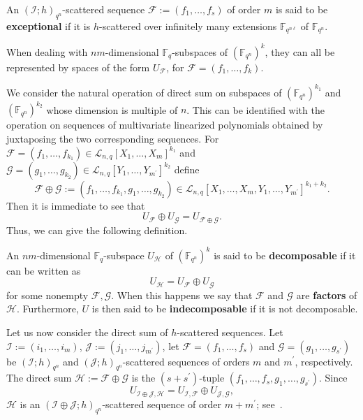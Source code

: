 \begin{defi}\label{Def:ExceptionalScatteredSequence}
An $(\mathcal I;h)_{q^n}$-scattered sequence  $\mathcal{F}:=(f_1,\ldots,f_s)$ of order $m$  is said to be \textbf{exceptional} if it is $h$-scattered over infinitely many extensions $\mathbb{F}_{q^{n\ell}}$ of $\mathbb{F}_{q^n}$.
\end{defi}

When dealing with $nm$-dimensional $\mathbb{F}_q$-subspaces of $(\mathbb{F}_{q^n})^k$, they can all be represented by spaces of the form $U_{\mathcal F}$, for $\mathcal F=(f_1,\ldots,f_k)$.

We consider the natural operation of direct sum on subspaces of $(\mathbb{F}_{q^n})^{k_1}$ and $(\mathbb{F}_{q^n})^{k_2}$ whose dimension is multiple of $n$. This can be identified with the operation on sequences of multivariate linearized polynomials obtained by juxtaposing the two corresponding sequences. 
For $\mathcal F =(f_1,\ldots,f_{k_1})\in \mathcal{L}_{n,q}[X_1,\ldots,X_{m}]^{k_1}$ and $\mathcal G =(g_1,\ldots,g_{k_2})\in \mathcal{L}_{n,q}[Y_1,\ldots,Y_{m^{\prime}}]^{k_2}$ define $$\mathcal F \oplus \mathcal G:=(f_1,\ldots, f_{k_1},g_1,\ldots,g_{k_2})\in \mathcal{L}_{n,q}[X_1,\ldots,X_{m},Y_1,\ldots,Y_{m^{\prime}}]^{k_1+k_2}.$$ Then it is immediate to see that
$$ U_{\mathcal F} \oplus U_{\mathcal G} = U_{\mathcal{F}\oplus \mathcal{G}}.$$
 Thus, we can give the following definition.

\begin{defi}\label{def:decompoasable}
 An $nm$-dimensional $\mathbb{F}_q$-subspace $U_{\mathcal{H}}$ of $(\mathbb{F}_{q^n})^k$   is said to be \textbf{decomposable} if it can be written as
 $$U_{\mathcal{H}}=U_{\mathcal F}\oplus U_{\mathcal G}$$
 for some nonempty $\mathcal F, \mathcal G$. 
 When this happens we say that $\mathcal{F}$ and $\mathcal{G}$ are \textbf{factors} of $\mathcal{H}$. Furthermore, 
 $U$ is then said to be \textbf{indecomposable} if it is not decomposable. 
\end{defi}

Let us now consider the direct sum of $h$-scattered sequences.
Let $\mathcal I:=(i_1,\ldots,i_m)$, $\mathcal J:=(j_1,\ldots,j_{m^{\prime}})$, let $\mathcal{F}=(f_1,\ldots,f_{s})$ and $\mathcal{G}=(g_1,\ldots,g_{s^{\prime}})$ be $(\mathcal I;h)_{{q^n}}$ and $(\mathcal J;h)_{{q^n}}$-scattered sequences of orders $m$ and $m^{\prime}$, respectively.
The {direct sum} $\mathcal{H}:=\mathcal{F}\oplus \mathcal{G}$ is the $(s+s^{\prime})$-tuple $(f_1,\ldots,f_s,g_1,\ldots,g_{s^{\prime}})$. Since 
$$U_{\mathcal I\oplus\mathcal J,\mathcal{H}}=U_{\mathcal I,\mathcal{F}}\oplus U_{\mathcal J,\mathcal{G}},$$
$\mathcal{H}$ is an $(\mathcal I \oplus \mathcal J;h)_{q^{n}}$-scattered sequence of order $m+m^{\prime}$; see~\cite{BGMP,csajbok2021generalising}. 

